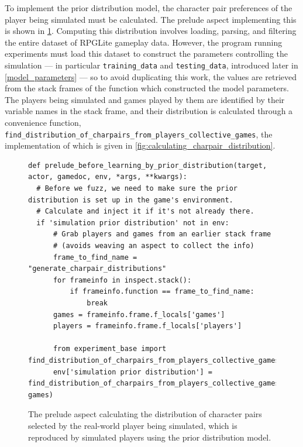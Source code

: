 To implement the prior distribution model, the character pair preferences of the
player being simulated must be calculated. The prelude aspect implementing this
is shown in \cref{fig:prelude_before_learning_by_prior_distribution}. Computing
this distribution involves loading, parsing, and filtering the entire dataset of
RPGLite gameplay data. However, the program running experiments must load this
dataset to construct the parameters controlling the simulation --- in particular
\lstinline{training_data} and \lstinline{testing_data}, introduced later in
\cref{model_parameters} --- so to avoid duplicating this work, the values are
retrieved from the stack frames of the function which constructed the model
parameters. The players being simulated and games played by them are identified
by their variable names in the stack frame, and their distribution is calculated
through a convenience function,
\lstinline{find_distribution_of_charpairs_from_players_collective_games}, the
implementation of which is given in
\cref{fig:calculating_charpair_distribution}.

\begin{figure}[hp]
  \centering
  \begin{lstlisting}[style=footnotesize_python]
def prelude_before_learning_by_prior_distribution(target, actor, gamedoc, env, *args, **kwargs):
  # Before we fuzz, we need to make sure the prior distribution is set up in the game's environment.
  # Calculate and inject it if it's not already there.
  if 'simulation prior distribution' not in env:
      # Grab players and games from an earlier stack frame
      # (avoids weaving an aspect to collect the info)
      frame_to_find_name = "generate_charpair_distributions"
      for frameinfo in inspect.stack():
          if frameinfo.function == frame_to_find_name:
              break
      games = frameinfo.frame.f_locals['games']
      players = frameinfo.frame.f_locals['players']

      from experiment_base import find_distribution_of_charpairs_from_players_collective_games
      env['simulation prior distribution'] = find_distribution_of_charpairs_from_players_collective_games(players, games)
  \end{lstlisting}
  \caption{The prelude aspect calculating the distribution of character pairs selected by the real-world player being simulated, which is reproduced by simulated players using the prior distribution model.}
  \label{fig:prelude_before_learning_by_prior_distribution}
\end{figure}

